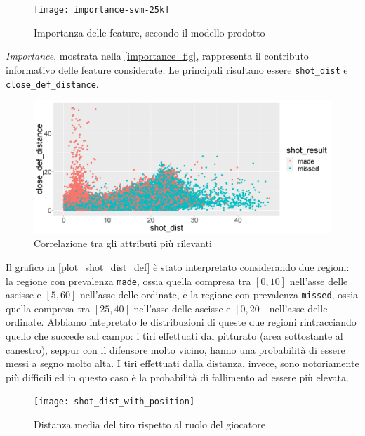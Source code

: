 \begin{figure}[H]
\centering
\caption{Importanza delle feature, secondo il modello prodotto}
\label{importance_fig}
	\texttt{[image: importance-svm-25k]}
\end{figure}

\par

\textit{Importance}, mostrata nella \autoref{importance_fig}, rappresenta il contributo informativo delle feature considerate. Le principali risultano essere \texttt{shot\_dist} e \texttt{close\_def\_distance}.

\begin{figure}[H]
\caption{Correlazione tra gli attributi più rilevanti}
\label{plot_shot_dist_def}
\includegraphics[width=\linewidth]{plot_shot_dist_def.png}
\end{figure}

Il grafico in \autoref{plot_shot_dist_def} è stato interpretato considerando due regioni: la regione con prevalenza \texttt{made}, ossia quella compresa tra $[0, 10]$ nell'asse delle ascisse e $[5, 60] $ nell'asse delle ordinate, e la regione con prevalenza \texttt{missed}, ossia quella compresa tra $[25, 40]$ nell'asse delle ascisse e $[0, 20] $ nell'asse delle ordinate.
Abbiamo intepretato le distribuzioni di queste due regioni rintracciando quello che succede sul campo: i tiri effettuati dal pitturato (area sottostante al canestro), seppur con il difensore molto vicino, hanno una probabilità di essere messi a segno molto alta. I tiri effettuati dalla distanza, invece, sono notoriamente più difficili ed in questo caso è la probabilità di fallimento ad essere più elevata.

\par

\begin{figure}
\caption{Distanza media del tiro rispetto al ruolo del giocatore}
\label{position_shot_dist}
\texttt{[image: shot\_dist\_with\_position]}
\end{figure}

